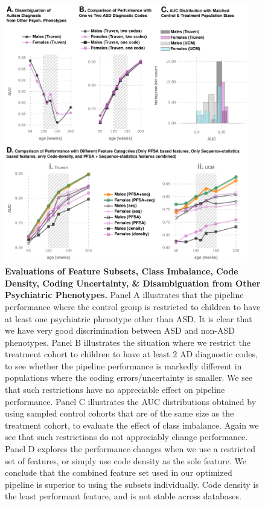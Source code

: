 \documentclass[onecolumn,,10pt]{IEEEtran}
\renewcommand{\captionN}[1]{\caption{\color{black} \sffamily \fontsize{9}{10}\selectfont #1  }}
\newif\iftikzX
\begin{document}
\begin{figure}[!ht]
  \tikzexternalenable
  \vspace{-10pt}
  
  \centering
\iftikzX

\else
  \includegraphics[width=0.95\textwidth]{Figures/External/sanitycheck}
  \fi 
  
 \captionN{\textbf{Evaluations of Feature Subsets, Class Imbalance, Code Density, Coding Uncertainty, \& Disambiguation from Other Psychiatric  Phenotypes.} Panel A illustrates that the pipeline performance where the control group is restricted to children to have at least one psychiatric phenotype other than ASD. It is clear that we have very good discrimination between ASD and non-ASD phenotypes. Panel B illustrates the situation where we restrict the treatment cohort to children to have at least $2$ AD diagnostic codes, to see whether the pipeline performance is markedly different in  populations where the coding errors/uncertainty is smaller. We see that such restrictions have no appreciable effect on  pipeline performance. Panel C illustrates the AUC distributions obtained by using sampled control cohorts that are of the same size as the treatment cohort, to evaluate the effect of class imbalance. Again we see that such restrictions do  not appreciably change performance. Panel D explores the performance changes when we use a restricted set of features, or simply use code density as the sole feature. We conclude that the combined feature set used in our optimized pipeline is superior to using the subsets individually. Code density is the least performant feature, and is not stable across databases. }\label{EXT-figcompsi}
\end{figure} 
\else
{}\label{EXT-figcompsi}
\fi
\end{document}
